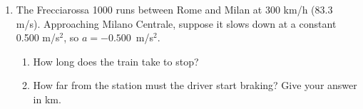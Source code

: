 \documentclass[12pt, twoside]{article}
\begin{document}
\begin{enumerate}[itemsep=0.5cm]
\item The Frecciarossa 1000 runs between Rome and Milan at 300 km/h (83.3 m/s).
  Approaching Milano Centrale, suppose it slows down at a constant 0.500 m/s$^2$,
  so \mbox{$a = -0.500$ m/s$^2$}.
  \begin{enumerate}[itemsep=0.4cm]
    \item How long does the train take to stop?
      \vspace{2.8cm}
    \item How far from the station must the driver start braking? Give your answer
      in km.
  \end{enumerate}

\end{enumerate}
\end{document}
